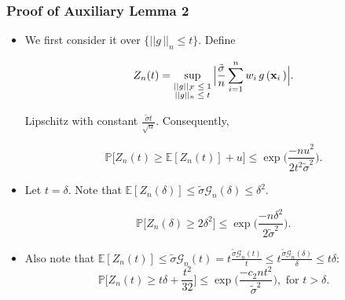 \documentclass[11pt]{beamer}
\newcommand{\Prob}{\mathbb{P}}
\newcommand{\E}{\mathbb{E}}
\newcommand{\bx}{\mathbf{x}}
\newcommand{\cF}{\mathcal{F}}
\newcommand{\cG}{\mathcal{G}}
\begin{document}
	\begin{frame}
		\frametitle{Proof of Auxiliary Lemma 2}
		\begin{small}

		\end{small}
		\begin{itemize}
			\item We first consider it over $\{||g\,||_n\leq t\}$. Define
			\begin{small}
			\begin{equation*}
				Z_n(t) = \sup_{
					\begin{scriptsize}
					\begin{matrix}
					||g||_\cF \leq 1\\
					||g||_n \leq t
					\end{matrix}
					\end{scriptsize}
					}\Big|
					\frac{\tilde \sigma}{n}	\sum_{i = 1}^{n} w_i\, g\,(\bx_i\,)
					\Big|.
			\end{equation*}
            \end{small}
			Lipschitz with constant $\frac{\tilde \sigma t}{\sqrt{n}}$. Consequently,
			\begin{small}
			\begin{equation*}
				\Prob\big[Z_n(t)\geq \E[Z_n(t)] + u\big] \leq \exp\Big(\frac{-nu^2}{2t^2\tilde{\sigma}^2}\Big).
			\end{equation*}
			\end{small}
		\item Let $t = \delta$. Note that $\E[Z_n(\delta)]\leq \tilde{\sigma}\cG_n(\delta)\leq \delta^2$.
		\begin{small}
			\begin{equation*}
			\Prob\big[Z_n(\delta)\geq 2\delta^2\big] \leq \exp\Big(\frac{-n\delta^2}{2\tilde{\sigma}^2}\Big).
			\end{equation*}
		\end{small}
		\item Also note that $\E[Z_n(t)] \leq \tilde{\sigma}\cG_n(t) = t\frac{\tilde{\sigma}\cG_n(t)}{t} \leq t\frac{\tilde{\sigma}\cG_n(\delta)}{\delta} \leq t \delta$:
		\begin{equation*}
			\Prob\Big[Z_n(t) \geq t\delta + \frac{t^2}{32}\Big] \leq \exp\Big(\frac{-c_2 nt^2}{\tilde{\sigma}^2}\Big), \text{ for } t>\delta.
		\end{equation*}
		\end{itemize}
	\end{frame}
\end{document}
